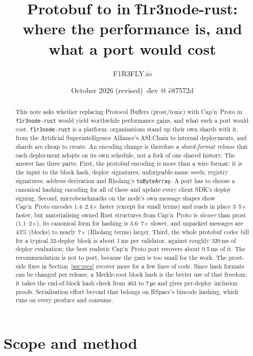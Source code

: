 \documentclass[10pt,a4paper]{article}
\title{\sffamily\bfseries Protobuf to \capnp{} in \f{f1r3node-rust}:\\[2pt]
\large\mdseries where the performance is, and what a port would cost}
\author{\sffamily F1R3FLY.io}
\date{\sffamily 20 October 2026 (revised) \quad$\cdot$\quad \f{dev} @ \f{e87572d}}
\newcommand{\f}[1]{\nolinkurl{#1}}
\newcommand{\capnp}{Cap'n~Proto}
\begin{document}
\maketitle
\thispagestyle{fancy}

\begin{abstract}
\noindent This note asks whether replacing Protocol Buffers (prost/tonic) with \capnp{} in
\f{f1r3node-rust} would yield worthwhile performance gains, and what such a port would cost.
\f{f1r3node-rust} is a platform: organisations stand up their own shards with it, from the
Artificial Superintelligence Alliance's ASI:Chain to internal deployments, and shards are cheap to
create. An encoding change is therefore a \emph{shard-format release} that each deployment adopts
on its own schedule, not a fork of one shared history. The answer has three parts. First, the
protobuf encoding is more than a wire format: it is the input to the block hash, deploy signatures,
unforgeable-name seeds, registry signatures, address derivation and Rholang's \f{toByteArray}. A
port has to choose a canonical hashing encoding for all of these and update every client SDK's
deploy signing. Second, micro\-benchmarks on the node's own message shapes show \capnp{} encodes
1.4--2.4$\times$ faster (except for small terms) and reads in place 3--5$\times$ faster, but
materialising owned Rust structures from \capnp{} is \emph{slower} than prost (1.1--2$\times$), its
canonical form for hashing is 3.6--7$\times$ slower, and unpacked messages are 43\% (blocks) to
nearly 7$\times$ (Rholang terms) larger. Third, the whole protobuf codec bill for a typical
32-deploy block is about 1\,ms per validator, against roughly 320\,ms of deploy evaluation; the
best realistic \capnp{} port recovers about 0.5\,ms of it. The recommendation is not to port,
because the gain is too small for the work. The prost-side fixes in Section~\ref{sec:recs}
recover more for a few lines of code. Since hash formats can be changed per release, a Merkle-root
block hash is the better use of that freedom: it takes the end-of-block hash check from
463 to 7\,\si{\micro\second} and gives per-deploy inclusion proofs. Serialisation effort beyond
that belongs on RSpace's bincode hashing, which runs on every produce and consume.
\end{abstract}

\section{Scope and method}
\end{document}
